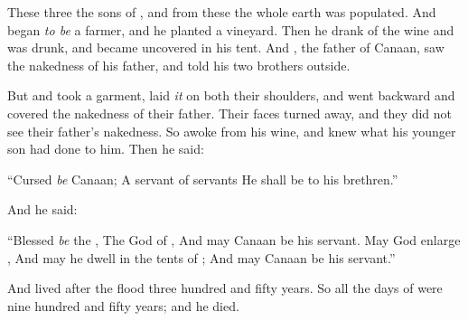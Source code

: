 \bverse These three  the sons of , and from these the whole earth was populated.
\bverse And  began \textit{to be} a farmer, and he planted a vineyard.
\bverse Then he drank of the wine and was drunk, and became uncovered in his tent.
\bverse And , the father of Canaan, saw the nakedness of his father, and told his two brothers outside.

\bverse But  and  took a garment, laid \textit{it} on both their shoulders, and went backward and covered the nakedness of their father. Their faces \were turned away, and they did not see their father's nakedness.
\bverse So  awoke from his wine, and knew what his younger son had done to him.
\bverse Then he said:
\begin{bquotation}
``Cursed \textit{be} Canaan; A servant of servants He shall be to his brethren.''
\end{bquotation}
\bverse And he said:
\begin{bquotation}
``Blessed \textit{be} the \lord, The God of , And may Canaan be his servant.
\bverse May God enlarge , And may he dwell in the tents of ; And may Canaan be his servant.''
\end{bquotation}

\bverse And  lived after the flood three hundred and fifty years.
\bverse So all the days of  were nine hundred and fifty years; and he died.

